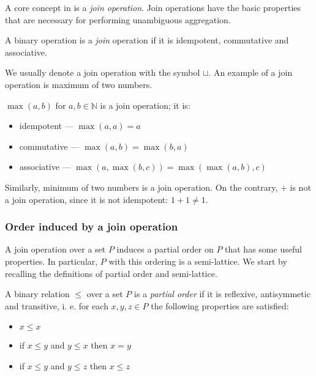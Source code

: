 A core concept in \datalogra is a \emph{join operation}. Join operations have the basic properties that are necessary for performing unambiguous aggregation.

\begin{defn}
A binary operation is a \emph{join} operation if it is idempotent, commutative and associative. 
\end{defn}

We usually denote a join operation with the symbol $\sqcup$.
An example of a join operation is maximum of two numbers.

\begin{exmp}
$\max(a, b)$ for $a, b \in \mathbb{N}$ is a join operation; it is:
\begin{itemize}
\item idempotent --- $\max(a, a) = a$
\item commutative --- $\max(a, b) = \max(b, a)$
\item associative --- $\max(a, \max(b, c)) = \max(\max(a, b), c)$
\end{itemize}

Similarly, minimum of two numbers is a join operation. On the contrary, $+$ is not a join operation, since it is not idempotent: $1+1 \ne 1$.
\end{exmp}

\subsubsection{Order induced by a join operation}

A join operation over a set $P$ induces a partial order on $P$ that has some useful properties. In particular, $P$ with this ordering is a semi-lattice. We start by recalling the definitions of partial order and semi-lattice.

\begin{defn}
A binary relation $\le$ over a set $P$ is a \emph{partial order} if it is reflexive, antisymmetic and transitive, i. e. for each $x, y, z \in P$ the following properties are satisfied:
\begin{itemize}
\item $x \le x$
\item if $x \le y$ and $y \le x$ then $x = y$
\item if $x \le y$ and $y \le z$ then $x \le z$
\end{itemize}
\end{defn}

